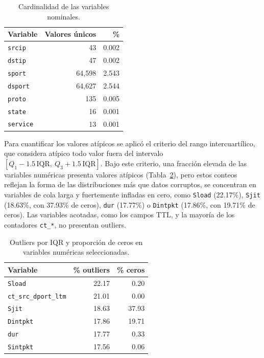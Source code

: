 \documentclass[conference]{IEEEtran}
\begin{document}
    \begin{table}[h!]
    \centering
    \caption{Cardinalidad de las variables nominales.}
    \label{tab:cardinalidad}
    \begin{tabular}{lrr}
    \hline
    \textbf{Variable} & \textbf{Valores únicos} & \textbf{\%} \\
    \hline
    \texttt{srcip}   & 43      & 0.002 \\
    \texttt{dstip}   & 47      & 0.002 \\
    \texttt{sport}   & 64,598  & 2.543 \\
    \texttt{dsport}  & 64,627  & 2.544 \\
    \texttt{proto}   & 135     & 0.005 \\
    \texttt{state}   & 16      & 0.001 \\
    \texttt{service} & 13      & 0.001 \\
    \hline
    \end{tabular}
    \end{table}

    Para cuantificar los valores atípicos se aplicó el criterio del rango
    intercuartílico, que considera atípico todo valor fuera del intervalo
    $[Q_1-1.5\,\mathrm{IQR},\ Q_3+1.5\,\mathrm{IQR}]$. Bajo este criterio, una
    fracción elevada de las variables numéricas presenta valores atípicos
    (Tabla~\ref{tab:outliers}), pero estos conteos reflejan la forma de las
    distribuciones más que datos corruptos, se concentran en variables de cola
    larga y fuertemente infladas en cero, como \texttt{Sload} (22.17\%),
    \texttt{Sjit} (18.63\%, con 37.93\% de ceros), \texttt{dur} (17.77\%) o
    \texttt{Dintpkt} (17.86\%, con 19.71\% de ceros). Las variables acotadas,
    como los campos TTL, y la mayoría de los contadores \texttt{ct\_*}, no
    presentan outliers.

    \begin{table}[h!]
    \centering
    \caption{Outliers por IQR y proporción de ceros en variables numéricas seleccionadas.}
    \label{tab:outliers}
    \begin{tabular}{lrr}
    \hline
    \textbf{Variable} & \textbf{\% outliers} & \textbf{\% ceros} \\
    \hline
    \texttt{Sload}          & 22.17 & 0.20  \\
    \texttt{ct\_src\_dport\_ltm} & 21.01 & 0.00  \\
    \texttt{Sjit}           & 18.63 & 37.93 \\
    \texttt{Dintpkt}        & 17.86 & 19.71 \\
    \texttt{dur}            & 17.77 & 0.33  \\
    \texttt{Sintpkt}        & 17.56 & 0.06  \\
    \hline
    \end{tabular}
    \end{table}
\end{document}
